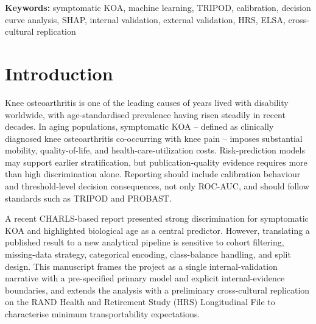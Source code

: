 \documentclass[11pt,a4paper]{article}
\begin{document}
\begin{abstract}
\textbf{Preliminary ELSA replication.}\ The trained model was applied to $n=8{,}416$ respondents from the
English Longitudinal Study of Ageing (ELSA) Wave 8 (2016--2017), using 14 of the 17 raw17 predictors
harmonised from the Gateway Harmonized ELSA file (raw16; Biological Age excluded because ELSA public
nurse visit files do not contain creatinine, BUN, or platelet assays for KDM-BA computation). The KOA
proxy was defined as ever-diagnosed arthritis plus difficulty stooping/kneeling/crouching (prevalence
$24.9\%$). ROC-AUC was $0.604$ (raw) / $0.606$ (isotonic-calibrated), with calibration restored after
split-calibrate-evaluate isotonic recalibration (slope $0.271 \rightarrow 0.938$, ECE $0.097 \rightarrow
0.005$). These results align closely with HRS and confirm a conservative lower bound on raw16
transportability across culturally distinct aging cohorts. A Wave 9 (2018--2019) sensitivity analysis
($n=8{,}683$) showed consistent results (ROC-AUC $0.596$), supporting temporal robustness despite
full BMI imputation in that wave.
\end{abstract}

\textbf{Keywords:} symptomatic KOA, machine learning, TRIPOD, calibration, decision curve analysis,
SHAP, internal validation, external validation, HRS, ELSA, cross-cultural replication

\section{Introduction}
Knee osteoarthritis is one of the leading causes of years lived with disability worldwide, with
age-standardised prevalence having risen steadily in recent decades\cite{Safiri2020}. In aging
populations, symptomatic KOA -- defined as clinically diagnosed knee osteoarthritis co-occurring with
knee pain -- imposes substantial mobility, quality-of-life, and health-care-utilization costs.
Risk-prediction models may support earlier stratification, but publication-quality evidence requires
more than high discrimination alone. Reporting should include calibration behaviour and threshold-level
decision consequences, not only ROC-AUC, and should follow standards such as TRIPOD\cite{Collins2015}
and PROBAST\cite{Wolff2019}.

A recent CHARLS-based report\cite{Fu2025} presented strong discrimination for symptomatic KOA and
highlighted biological age as a central predictor. However, translating a published result to a new
analytical pipeline is sensitive to cohort filtering, missing-data strategy, categorical encoding,
class-balance handling, and split design. This manuscript frames the project as a single
internal-validation narrative with a pre-specified primary model and explicit internal-evidence
boundaries, and extends the analysis with a preliminary cross-cultural replication on the RAND Health
and Retirement Study (HRS) Longitudinal File to characterise minimum transportability expectations.
\end{document}
